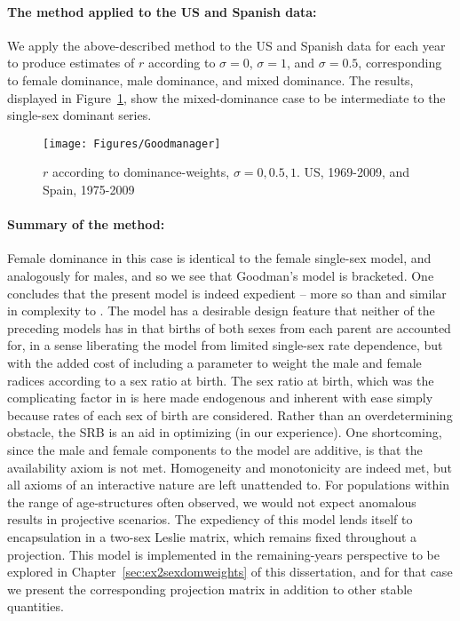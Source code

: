 \paragraph{The method applied to the US and Spanish data: } We apply the
above-described method to the US and Spanish data for each year to produce
estimates of $r$ according to $\sigma = 0$, $\sigma = 1$, and $\sigma = 0.5$,
corresponding to female dominance, male dominance, and mixed dominance. The
results, displayed in Figure~\ref{fig:Goodmanr}, show the mixed-dominance case
to be intermediate to the single-sex dominant series. 

\begin{figure}[ht!]
        \centering  
          \caption{$r$ according to dominance-weights, $\sigma = 0, 0.5, 1$.
          US, 1969-2009, and Spain, 1975-2009}
           \texttt{[image: Figures/Goodmanager]}
          \label{fig:Goodmanr}
\end{figure}

\paragraph{Summary of the method: }
Female dominance in this case is identical to the female single-sex model, and
analogously for males, and so we see that Goodman's model is bracketed. One concludes that the present
model is indeed expedient -- more so than \citet{mitra1978derivation} and
similar in complexity to \citet{pollard1948measurement}. The model has a desirable
design feature that neither of the preceding models has in that 
births of both sexes from each parent are accounted for, in a sense liberating
the model from limited single-sex rate dependence, but with the added cost of 
including a parameter to weight the male and female radices according 
to a sex ratio at birth. The sex ratio at birth, which was the complicating factor in
\citet{mitra1978derivation} is here made endogenous and inherent with ease
simply because rates of each sex of birth are considered. Rather than an
overdetermining obstacle, the SRB is an aid in optimizing (in our experience).
One shortcoming, since the male and female components to the model are
additive, is that the availability axiom is not met. Homogeneity and
monotonicity are indeed met, but all axioms of an interactive nature are left
unattended to. For populations within the range of age-structures often
observed, we would not expect anomalous results in projective scenarios. The
expediency of this model lends itself to encapsulation in a two-sex Leslie
matrix, which remains fixed throughout a projection. This model is
implemented in the remaining-years perspective to be explored in
Chapter~\ref{sec:ex2sexdomweights} of this dissertation, and for that case we
present the corresponding projection matrix in addition to other stable quantities.

\FloatBarrier
